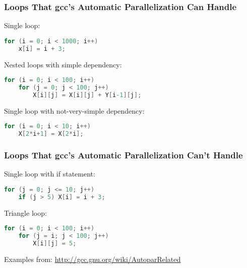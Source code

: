 \begin{frame}[fragile]
  \frametitle{Loops That gcc's Automatic Parallelization Can Handle}


  Single loop:
  \begin{lstlisting}[language=C]
for (i = 0; i < 1000; i++)
    x[i] = i + 3;
  \end{lstlisting}
  \vfill
  Nested loops with simple dependency:
  \begin{lstlisting}[language=C]
for (i = 0; i < 100; i++)
    for (j = 0; j < 100; j++)
        X[i][j] = X[i][j] + Y[i-1][j];
  \end{lstlisting}
  \vfill
  Single loop with not-very-simple dependency:
  \begin{lstlisting}[language=C]
for (i = 0; i < 10; i++)
    X[2*i+1] = X[2*i];
  \end{lstlisting}

\end{frame}

\begin{frame}[fragile]
  \frametitle{Loops That gcc's Automatic Parallelization Can't Handle}


  Single loop with if statement:
  \begin{lstlisting}[language=C]
for (j = 0; j <= 10; j++)
    if (j > 5) X[i] = i + 3;
  \end{lstlisting}
  \vfill
  Triangle loop:
  \begin{lstlisting}[language=C]
for (i = 0; i < 100; i++)
    for (j = i; j < 100; j++)
        X[i][j] = 5;
  \end{lstlisting}
  \vfill
  Examples from: \url{http://gcc.gnu.org/wiki/AutoparRelated}

\end{frame}

